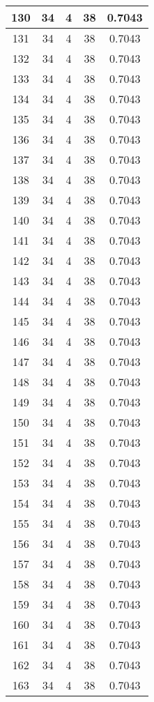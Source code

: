 \documentclass[letterpaper, 12pt]{article}
\begin{document}
\begin{longtable}{|c|c|c|c|c|}
\hline
130 & 34 & 4 & 38 & 0.7043 \\
\hline
131 & 34 & 4 & 38 & 0.7043 \\
\hline
132 & 34 & 4 & 38 & 0.7043 \\
\hline
133 & 34 & 4 & 38 & 0.7043 \\
\hline
134 & 34 & 4 & 38 & 0.7043 \\
\hline
135 & 34 & 4 & 38 & 0.7043 \\
\hline
136 & 34 & 4 & 38 & 0.7043 \\
\hline
137 & 34 & 4 & 38 & 0.7043 \\
\hline
138 & 34 & 4 & 38 & 0.7043 \\
\hline
139 & 34 & 4 & 38 & 0.7043 \\
\hline
140 & 34 & 4 & 38 & 0.7043 \\
\hline
141 & 34 & 4 & 38 & 0.7043 \\
\hline
142 & 34 & 4 & 38 & 0.7043 \\
\hline
143 & 34 & 4 & 38 & 0.7043 \\
\hline
144 & 34 & 4 & 38 & 0.7043 \\
\hline
145 & 34 & 4 & 38 & 0.7043 \\
\hline
146 & 34 & 4 & 38 & 0.7043 \\
\hline
147 & 34 & 4 & 38 & 0.7043 \\
\hline
148 & 34 & 4 & 38 & 0.7043 \\
\hline
149 & 34 & 4 & 38 & 0.7043 \\
\hline
150 & 34 & 4 & 38 & 0.7043 \\
\hline
151 & 34 & 4 & 38 & 0.7043 \\
\hline
152 & 34 & 4 & 38 & 0.7043 \\
\hline
153 & 34 & 4 & 38 & 0.7043 \\
\hline
154 & 34 & 4 & 38 & 0.7043 \\
\hline
155 & 34 & 4 & 38 & 0.7043 \\
\hline
156 & 34 & 4 & 38 & 0.7043 \\
\hline
157 & 34 & 4 & 38 & 0.7043 \\
\hline
158 & 34 & 4 & 38 & 0.7043 \\
\hline
159 & 34 & 4 & 38 & 0.7043 \\
\hline
160 & 34 & 4 & 38 & 0.7043 \\
\hline
161 & 34 & 4 & 38 & 0.7043 \\
\hline
162 & 34 & 4 & 38 & 0.7043 \\
\hline
163 & 34 & 4 & 38 & 0.7043 \\

\end{longtable}
\end{document}
